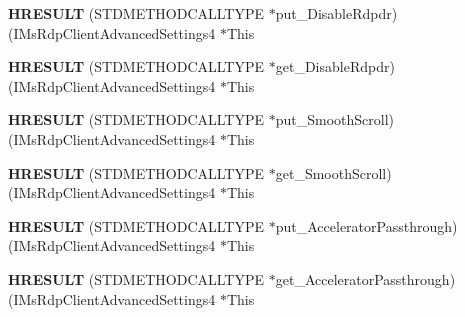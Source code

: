 \begin{DoxyCompactItemize}
\item 
\mbox{\label{struct_i_ms_rdp_client_advanced_settings4_vtbl_ad2af3b92b5f48b10885367c6f9c8b14c}} 
{\bfseries H\+R\+E\+S\+U\+LT} (S\+T\+D\+M\+E\+T\+H\+O\+D\+C\+A\+L\+L\+T\+Y\+PE $\ast$put\+\_\+\+Disable\+Rdpdr)(I\+Ms\+Rdp\+Client\+Advanced\+Settings4 $\ast$This
\item 
\mbox{\label{struct_i_ms_rdp_client_advanced_settings4_vtbl_adb10b9d46896a6e97d8582cd351bc5a5}} 
{\bfseries H\+R\+E\+S\+U\+LT} (S\+T\+D\+M\+E\+T\+H\+O\+D\+C\+A\+L\+L\+T\+Y\+PE $\ast$get\+\_\+\+Disable\+Rdpdr)(I\+Ms\+Rdp\+Client\+Advanced\+Settings4 $\ast$This
\item 
\mbox{\label{struct_i_ms_rdp_client_advanced_settings4_vtbl_a3a1c9556a90acf7232c2c6a6c552a94a}} 
{\bfseries H\+R\+E\+S\+U\+LT} (S\+T\+D\+M\+E\+T\+H\+O\+D\+C\+A\+L\+L\+T\+Y\+PE $\ast$put\+\_\+\+Smooth\+Scroll)(I\+Ms\+Rdp\+Client\+Advanced\+Settings4 $\ast$This
\item 
\mbox{\label{struct_i_ms_rdp_client_advanced_settings4_vtbl_a8b4bd631bc213d9c01cbcee05c51b256}} 
{\bfseries H\+R\+E\+S\+U\+LT} (S\+T\+D\+M\+E\+T\+H\+O\+D\+C\+A\+L\+L\+T\+Y\+PE $\ast$get\+\_\+\+Smooth\+Scroll)(I\+Ms\+Rdp\+Client\+Advanced\+Settings4 $\ast$This
\item 
\mbox{\label{struct_i_ms_rdp_client_advanced_settings4_vtbl_a90efebd649af98e16160a5de5bcd607e}} 
{\bfseries H\+R\+E\+S\+U\+LT} (S\+T\+D\+M\+E\+T\+H\+O\+D\+C\+A\+L\+L\+T\+Y\+PE $\ast$put\+\_\+\+Accelerator\+Passthrough)(I\+Ms\+Rdp\+Client\+Advanced\+Settings4 $\ast$This
\item 
\mbox{\label{struct_i_ms_rdp_client_advanced_settings4_vtbl_a000a9c1660096461bd92debf2c5b0d8e}} 
{\bfseries H\+R\+E\+S\+U\+LT} (S\+T\+D\+M\+E\+T\+H\+O\+D\+C\+A\+L\+L\+T\+Y\+PE $\ast$get\+\_\+\+Accelerator\+Passthrough)(I\+Ms\+Rdp\+Client\+Advanced\+Settings4 $\ast$This
\item 
\mbox{\label{struct_i_ms_rdp_client_advanced_settings4_vtbl_acfcfc3f9aa145511bf1fc66b7defdab3}} 

\end{DoxyCompactItemize}
